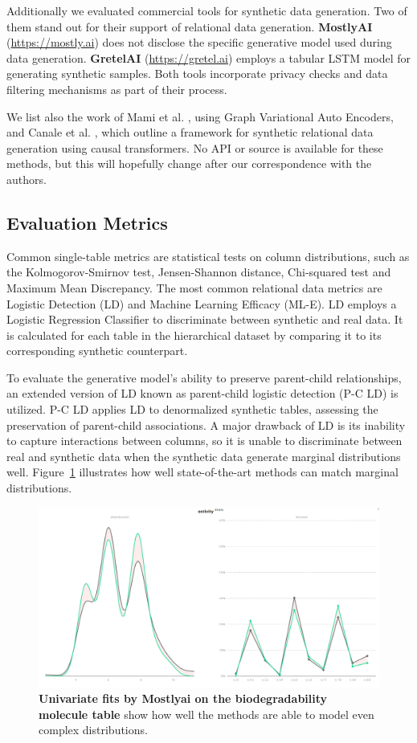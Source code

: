 \documentclass[fleqn,moreauthors,10pt]{ds_report}
\begin{document}
Additionally we evaluated commercial tools for synthetic data generation. Two of them stand out for their support of relational data generation. \textbf{MostlyAI} (\url{https://mostly.ai}) does not disclose the specific generative model used during data generation. \textbf{GretelAI} (\url{https://gretel.ai}) employs a tabular LSTM model for generating synthetic samples. Both tools incorporate privacy checks and data filtering mechanisms as part of their process.

We list also the work of Mami et al. \cite{mami2022generating}, using Graph Variational Auto Encoders, and Canale et al. \cite{canale2022generative}, which outline a framework for synthetic relational data generation using causal transformers. No API or source is available for these methods, but this will hopefully change after our correspondence with the authors.

\subsection{Evaluation Metrics}
Common single-table metrics are statistical tests on column distributions, such as the Kolmogorov-Smirnov test, Jensen-Shannon distance, Chi-squared test and Maximum Mean Discrepancy. The most common relational data metrics are Logistic Detection (LD) and Machine Learning Efficacy (ML-E). LD employs a Logistic Regression Classifier to discriminate between synthetic and real data. It is calculated for each table in the hierarchical dataset by comparing it to its corresponding synthetic counterpart. 

To evaluate the generative model's ability to preserve parent-child relationships, an extended version of LD known as parent-child logistic detection (P-C LD) is utilized. P-C LD applies LD to denormalized synthetic tables, assessing the preservation of parent-child associations. A major drawback of LD is its inability to capture interactions between columns, so it is unable to discriminate between real and synthetic data when the synthetic data generate marginal distributions well. Figure~\ref{fig:univariate} illustrates how well state-of-the-art methods can match marginal distributions.

\begin{figure}[h!]
    \centering
    \includegraphics[width=\linewidth]{fig/mostly-univariate.png}
    \caption{\textbf{Univariate fits by Mostlyai on the biodegradability molecule table} show how well the methods are able to model even complex distributions.
    }
    \label{fig:univariate}
\end{figure}
\end{document}
